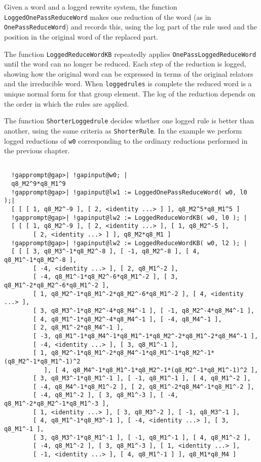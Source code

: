 \documentclass[a4paper,11pt]{report}
\begin{document}
{{{ Given a word and a logged rewrite system, the function \texttt{LoggedOnePassReduceWord} makes one reduction of the word (as in \texttt{OnePassReduceWord}) and records this, using the log part of the rule used and the position in
the original word of the replaced part. 

 The function \texttt{LoggedReduceWordKB} repeatedly applies \texttt{OnePassLoggedReduceWord} until the word can no longer be reduced. Each step of the reduction is logged,
showing how the original word can be expressed in terms of the original
relators and the irreducible word. When \texttt{loggedrules} is complete the reduced word is a unique normal form for that group element.
The log of the reduction depends on the order in which the rules are applied. 

 The function \texttt{ShorterLoggedrule} decides whether one logged rule is better than another, using the same
criteria as \texttt{ShorterRule}. In the example we perform logged reductions of \texttt{w0} corresponding to the ordinary reductions performed in the previous chapter. 

 }

 
\begin{Verbatim}[commandchars=!@|,fontsize=\small,frame=single,label=Example]
  
  !gapprompt@gap>| !gapinput@w0; |
  q8_M2^9*q8_M1^9
  !gapprompt@gap>| !gapinput@lw1 := LoggedOnePassReduceWord( w0, l0 );|
  [ [ [ 1, q8_M2^-9 ], [ 2, <identity ...> ] ], q8_M2^5*q8_M1^5 ]
  !gapprompt@gap>| !gapinput@lw2 := LoggedReduceWordKB( w0, l0 ); |
  [ [ [ 1, q8_M2^-9 ], [ 2, <identity ...> ], [ 1, q8_M2^-5 ],
        [ 2, <identity ...> ] ], q8_M2*q8_M1 ]
  !gapprompt@gap>| !gapinput@lw2 := LoggedReduceWordKB( w0, l2 ); |
  [ [ [ 3, q8_M3^-1*q8_M2^-8 ], [ -1, q8_M2^-8 ], [ 4, q8_M1^-1*q8_M2^-8 ], 
        [ -4, <identity ...> ], [ 2, q8_M1^-2 ], 
        [ -4, q8_M1^-1*q8_M2^-6*q8_M1^-2 ], [ 3, q8_M1^-2*q8_M2^-6*q8_M1^-2 ], 
        [ 1, q8_M2^-1*q8_M1^-2*q8_M2^-6*q8_M1^-2 ], [ 4, <identity ...> ], 
        [ 3, q8_M3^-1*q8_M2^-4*q8_M4^-1 ], [ -1, q8_M2^-4*q8_M4^-1 ], 
        [ 4, q8_M1^-1*q8_M2^-4*q8_M4^-1 ], [ -4, q8_M4^-1 ], 
        [ 2, q8_M1^-2*q8_M4^-1 ], 
        [ -3, q8_M1^-1*q8_M4^-1*q8_M1^-1*q8_M2^-2*q8_M1^-2*q8_M4^-1 ], 
        [ -4, <identity ...> ], [ 3, q8_M1^-1 ], 
        [ 1, q8_M2^-1*q8_M1^-2*q8_M4^-1*q8_M1^-1*q8_M2^-1*(q8_M2^-1*q8_M1^-1)^2 
           ], [ 4, q8_M4^-1*q8_M1^-1*q8_M2^-1*(q8_M2^-1*q8_M1^-1)^2 ], 
        [ 3, q8_M3^-1*q8_M1^-1 ], [ -1, q8_M1^-1 ], [ 4, q8_M1^-2 ], 
        [ -4, q8_M4^-1*q8_M1^-2 ], [ 2, q8_M1^-2*q8_M4^-1*q8_M1^-2 ], 
        [ -4, q8_M1^-2 ], [ 3, q8_M1^-3 ], [ -4, q8_M1^-2*q8_M2^-1*q8_M1^-3 ], 
        [ 1, <identity ...> ], [ 3, q8_M3^-2 ], [ -1, q8_M3^-1 ], 
        [ 4, q8_M1^-1*q8_M3^-1 ], [ -4, <identity ...> ], [ 3, q8_M1^-1 ], 
        [ 3, q8_M3^-1*q8_M1^-1 ], [ -1, q8_M1^-1 ], [ 4, q8_M1^-2 ], 
        [ -4, q8_M1^-2 ], [ 3, q8_M1^-3 ], [ 1, <identity ...> ], 
        [ -1, <identity ...> ], [ 4, q8_M1^-1 ] ], q8_M1*q8_M4 ]
  

\end{Verbatim}}}
\end{document}
